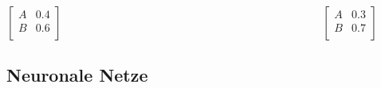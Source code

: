 \documentclass{article}
\newcommand{\prob}{\textit{P}}
\begin{document}
					\hspace{-5.5cm}
					$\begin{bmatrix}
						A & 0.4\\
						B & 0.6\\
					\end{bmatrix}$
					\ \ \ \ \ \ \ \ \ \ \ \ \ \ \ \ \ \ \ \ \ \ \ \ \ \ \ \ \ \ \ \ \ \ \ \ \ \ \ \ \ \ \ \ \ \ $\begin{bmatrix}
						A & 0.3\\
						B & 0.7\\
					\end{bmatrix}$\\
	\subsection*{Neuronale Netze}
\end{document}

